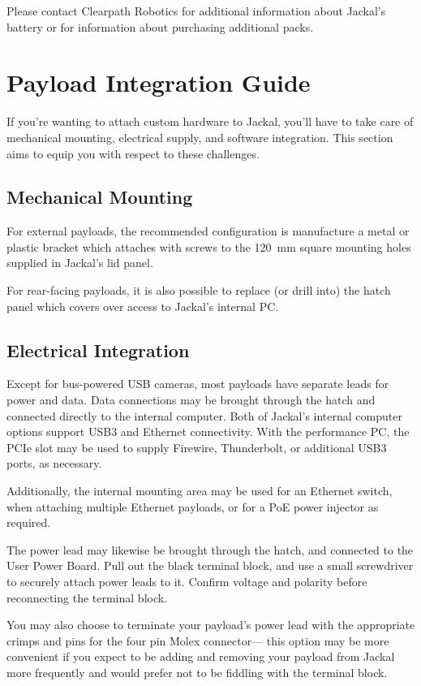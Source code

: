 \documentclass[]{clearpath-manual}
\begin{document}
Please contact Clearpath Robotics for additional information about Jackal's battery or
for information about purchasing additional packs.


\section{Payload Integration Guide}

If you're wanting to attach custom hardware to Jackal, you'll have to take care of
mechanical mounting, electrical supply, and software integration. This section
aims to equip you with respect to these challenges.

\subsection{Mechanical Mounting}

For external payloads, the recommended configuration is manufacture a metal or plastic bracket
which attaches with screws to the \SI{120}{\mm} square mounting holes supplied in Jackal's lid
panel.

For rear-facing payloads, it is also possible to replace (or drill into) the hatch panel which
covers over access to Jackal's internal PC.

\subsection{Electrical Integration}\label{payload-elec}

Except for bus-powered USB cameras, most payloads have separate leads for power and data. Data
connections may be brought through the hatch and connected directly to the internal computer. Both
of Jackal's internal computer options support USB3 and Ethernet connectivity. With the performance
PC, the PCIe slot may be used to supply Firewire, Thunderbolt, or additional USB3 ports, as necessary.

Additionally, the internal mounting area may be used for an Ethernet switch, when attaching multiple
Ethernet payloads, or for a PoE power injector as required.

The power lead may likewise be brought through the hatch, and connected to the User Power Board. Pull
out the black terminal block, and use a small screwdriver to securely attach power leads to it.
Confirm voltage and polarity before reconnecting the terminal block.

You may also choose to terminate your payload's power lead with the appropriate crimps and pins
for the four pin Molex connector--- this option may be more convenient if you expect to be adding
and removing your payload from Jackal more frequently and would prefer not to be fiddling with the
terminal block.
\end{document}
